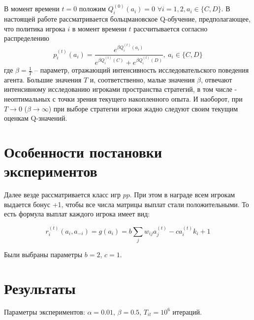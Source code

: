 \documentclass[12pt]{extarticle}
\begin{document}
В момент времени $t=0$ положим $Q^{(0)}_i(a_i) = 0$ $\forall i=1,2, a_i\in\{C,D\}$. В настоящей работе рассматривается больцмановское Q-обу\-чение, предполагающее, что политика игрока $i$ в момент времени $t$ рассчитывается согласно распределению 
\begin{equation}
    \label{eq_boltzmann}
    p^{(t)}_i(a_i) =  \frac{e^{\beta Q^{(t)}_i(a_i)}}{e^{\beta Q^{(t)}_i(C)} + e^{\beta Q^{(t)}_i(D)}},\ a_i\in\{C,D\}
\end{equation}
где $\beta = \frac{1}{T}$ -- параметр,  отражающий интенсивность исследовательского поведения агента. 
Большие значения $T$ и, соответственно, малые значения $\beta$, отвечают интенсивному исследованию игроками пространства стратегий, в том числе - неоптимальных с точки зрения текущего накопленного опыта. И наоборот, при $T \to 0$ ($\beta \to \infty$) при выборе стратегии игроки жадно следуют своим текущим оценкам Q-значений. 

\section{Особенности постановки экспериментов}

Далее везде рассматривается класс игр $pp$. При этом в награде всем игрокам выдается бонус +1, чтобы все числа матрицы выплат стали положительными. То есть формула выплат каждого игрока имеет вид:

\[
r_i^{(t)}(a_i, a_{-i}) = g(a_i) = b \sum_j w_{ij}a^{(t)}_j - c a^{(t)}_i k_i + 1
\]

Были выбраны параметры $b=2$, $c=1$.

\section{Результаты}

Параметры экспериментов: $\alpha=0.01$, $\beta = 0.5$, $T_{it}=10^6$ итераций.
\end{document}
